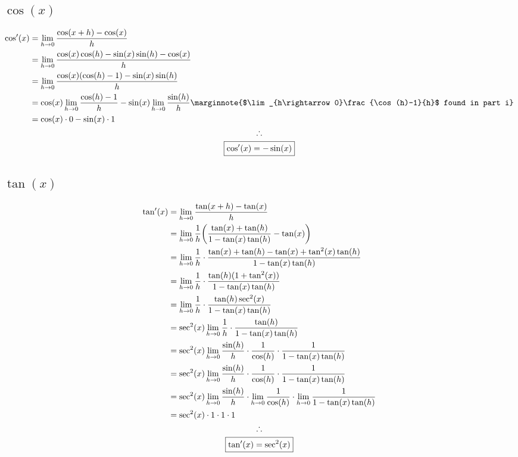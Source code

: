 \documentclass[letterpaper]{article}
\DeclarePairedDelimiter\paren{(}{)}
\begin{document}
\subsection{$\cos(x)$}
\begin{gather*}
	\begin{aligned}
		\cos'(x)&=\lim_{h\rightarrow0}\frac{\cos(x+h)-\cos(x)}{h} \\
		&=\lim_{h\rightarrow0}\frac{\cos(x)\cos(h)-\sin(x)\sin(h)-\cos(x)}{h} \\
		&=\lim_{h\rightarrow0}\frac{\cos(x)(\cos(h)-1)-\sin(x)\sin(h)}{h} \\
		&=\cos(x)\lim_{h\rightarrow0}\frac{\cos(h)-1}{h}-\sin(x)\lim_{h\rightarrow0}\frac{\sin(h)}{h} \marginnote{$\lim_{h\rightarrow0}\frac{\cos(h)-1}{h}$ found in part i} \\
		&=\cos(x)\cdot0-\sin(x)\cdot1 
	\end{aligned} \\
	\therefore \\
	\boxed{\cos'(x)=-\sin(x)}
\end{gather*}
\subsection{$\tan(x)$}
\begin{gather*}
	\begin{aligned}
		\tan'(x)&=\lim_{h\rightarrow0}\frac{\tan(x+h)-\tan(x)}{h} \\
		&=\lim_{h\rightarrow0}\frac{1}{h}\paren[\bigg]{\frac{\tan(x)+\tan(h)}{1-\tan(x)\tan(h)}-\tan(x)} \\
		&=\lim_{h\rightarrow0}\frac{1}{h}\cdot\frac{\tan(x)+\tan(h)-\tan(x)+\tan^2(x)\tan(h)}{1-\tan(x)\tan(h)} \\
		&=\lim_{h\rightarrow0}\frac{1}{h}\cdot\frac{\tan(h)(1+\tan^2(x))}{1-\tan(x)\tan(h)} \\
		&=\lim_{h\rightarrow0}\frac{1}{h}\cdot\frac{\tan(h)\sec^2(x)}{1-\tan(x)\tan(h)} \\
		&=\sec^2(x)\lim_{h\rightarrow0}\frac{1}{h}\cdot\frac{\tan(h)}{1-\tan(x)\tan(h)} \\
		&=\sec^2(x)\lim_{h\rightarrow0}\frac{\sin(h)}{h}\cdot\frac{1}{\cos(h)}\cdot\frac{1}{1-\tan(x)\tan(h)} \\
		&=\sec^2(x)\lim_{h\rightarrow0}\frac{\sin(h)}{h}\cdot\frac{1}{\cos(h)}\cdot\frac{1}{1-\tan(x)\tan(h)} \\
		&=\sec^2(x)\lim_{h\rightarrow0}\frac{\sin(h)}{h}\cdot\lim_{h\rightarrow0}\frac{1}{\cos(h)}\cdot\lim_{h\rightarrow0}\frac{1}{1-\tan(x)\tan(h)} \\
		&=\sec^2(x)\cdot1\cdot1\cdot1 \\
	\end{aligned} \\
	\therefore \\
	\boxed{\tan'(x)=\sec^2(x)}
\end{gather*}
\end{document}
